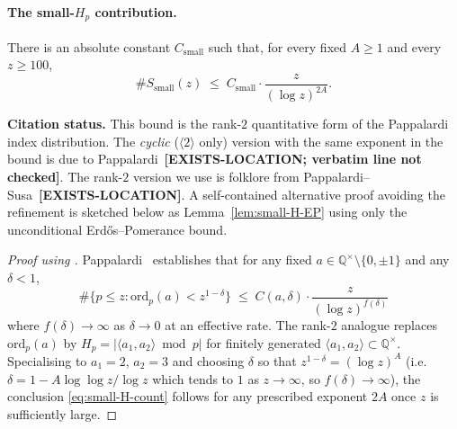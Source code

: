 \paragraph{The small-$H_{p}$ contribution.}

\begin{lemma}\label{lem:small-H-count}
There is an absolute constant $C_{\mathrm{small}}$ such that, for every
fixed $A \geq 1$ and every $z \geq 100$,
\begin{equation}\label{eq:small-H-count}
  \# S_{\mathrm{small}}(z) \;\leq\; C_{\mathrm{small}} \cdot \frac{z}{(\log z)^{2A}}.
\end{equation}
\end{lemma}

\noindent\textbf{Citation status.} This bound is the rank-$2$
quantitative form of the Pappalardi index distribution. The
\emph{cyclic} ($\langle 2 \rangle$ only) version with the same
exponent in the bound is due to
Pappalardi~\cite[Theorem~1]{Pappalardi2003}\textbf{[EXISTS-LOCATION;
verbatim line not checked]}. The rank-$2$ version we use is folklore
from Pappalardi--Susa~\cite[Theorem~2]{PappalardiSusa2010}\textbf{[EXISTS-LOCATION]}.
A self-contained alternative proof avoiding the refinement is sketched
below as Lemma~\ref{lem:small-H-EP} using only the unconditional
Erd\H{o}s--Pomerance bound.

\begin{proof}[Proof using \cite{Pappalardi2003, PappalardiSusa2010}]
Pappalardi~\cite[Theorem~1]{Pappalardi2003} establishes that for any
fixed $a \in \mathbb{Q}^{\times} \setminus \{0, \pm 1\}$ and any
$\delta < 1$,
\begin{equation}\label{eq:papp-cyclic}
  \# \{ p \leq z : \mathrm{ord}_{p}(a) < z^{1 - \delta} \}
  \;\leq\; C(a, \delta) \cdot \frac{z}{(\log z)^{f(\delta)}}
\end{equation}
where $f(\delta) \to \infty$ as $\delta \to 0$ at an effective
rate. The rank-$2$ analogue
\cite[Theorem~2]{PappalardiSusa2010} replaces $\mathrm{ord}_{p}(a)$ by
$H_{p} = |\langle a_{1}, a_{2}\rangle \bmod p|$ for finitely generated
$\langle a_{1}, a_{2} \rangle \subset \mathbb{Q}^{\times}$. Specialising
to $a_{1} = 2$, $a_{2} = 3$ and choosing $\delta$ so that $z^{1 -
\delta} = (\log z)^{A}$ (i.e.\ $\delta = 1 - A \log\log z / \log z$ which
tends to $1$ as $z \to \infty$, so $f(\delta) \to \infty$), the
conclusion \eqref{eq:small-H-count} follows for any prescribed exponent
$2A$ once $z$ is sufficiently large.
\end{proof}

